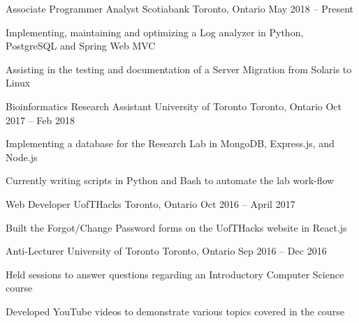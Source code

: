 \begin{cventries}
\cventry
    {Associate Programmer Analyst}
    {Scotiabank}
    {Toronto, Ontario}
    {May 2018 -- Present}
    {
      \begin{cvitems}
        \item {Implementing, maintaining and optimizing a Log analyzer in Python, PostgreSQL and Spring Web MVC}
        \item {Assisting in the testing and documentation of a Server Migration from Solaris to Linux}
      \end{cvitems}
    }

\cventry
    {Bioinformatics Research Assistant}
    {University of Toronto}
    {Toronto, Ontario}
    {Oct 2017 -- Feb 2018}
    {
      \begin{cvitems}
        \item {Implementing a database for the Research Lab in MongoDB, Express.js, and Node.js}
        \item {Currently writing scripts in Python and Bash to automate the lab work-flow}
      \end{cvitems}
    }


\cventry
    {Web Developer}
    {UofTHacks}
    {Toronto, Ontario}
    {Oct 2016 -- April 2017}
    {
      \begin{cvitems}
        \item {Built the Forgot/Change Password forms on the UofTHacks website in React.js}
      \end{cvitems}
    }
\cventry
    {Anti-Lecturer}
    {University of Toronto}
    {Toronto, Ontario}
    {Sep 2016 -- Dec 2016}
    {
      \begin{cvitems}
        \item {Held sessions to answer questions regarding an Introductory Computer Science course}
        \item {Developed YouTube videos to demonstrate various topics covered in the course}
      \end{cvitems}
    }
\end{cventries}
